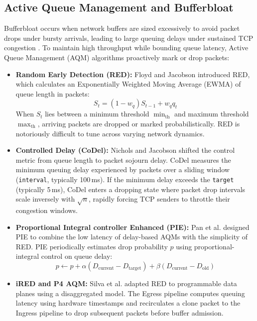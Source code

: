 \documentclass[12pt,a4paper,oneside]{report}
\begin{document}
\subsection{Active Queue Management and Bufferbloat}
Bufferbloat occurs when network buffers are sized excessively to avoid packet drops under bursty arrivals, leading to large queuing delays under sustained TCP congestion \cite{getty2011bufferbloat}. To maintain high throughput while bounding queue latency, Active Queue Management (AQM) algorithms proactively mark or drop packets:
\begin{itemize}
  \item \textbf{Random Early Detection (RED):} Floyd and Jacobson \cite{floyd1993red} introduced RED, which calculates an Exponentially Weighted Moving Average (EWMA) of queue length in packets:
  \begin{equation}
    S_t = (1 - w_q) S_{t-1} + w_q q_t
  \end{equation}
  When $S_t$ lies between a minimum threshold $\min_{\text{th}}$ and maximum threshold $\max_{\text{th}}$, arriving packets are dropped or marked probabilistically. RED is notoriously difficult to tune across varying network dynamics.
  \item \textbf{Controlled Delay (CoDel):} Nichols and Jacobson \cite{nichols2012codel} shifted the control metric from queue length to packet sojourn delay. CoDel measures the minimum queuing delay experienced by packets over a sliding window (\texttt{interval}, typically 100\,ms). If the minimum delay exceeds the \texttt{target} (typically 5\,ms), CoDel enters a dropping state where packet drop intervals scale inversely with $\sqrt{n}$, rapidly forcing TCP senders to throttle their congestion windows.
  \item \textbf{Proportional Integral controller Enhanced (PIE):} Pan et al. \cite{pan2013pie} designed PIE to combine the low latency of delay-based AQMs with the simplicity of RED. PIE periodically estimates drop probability $p$ using proportional-integral control on queue delay:
  \begin{equation}
    p \leftarrow p + \alpha (D_{\text{current}} - D_{\text{target}}) + \beta (D_{\text{current}} - D_{\text{old}})
  \end{equation}
  \item \textbf{iRED and P4 AQM:} Silva et al. \cite{silva2021ired} adapted RED to programmable data planes using a disaggregated model. The Egress pipeline computes queuing latency using hardware timestamps and recirculates a clone packet to the Ingress pipeline to drop subsequent packets before buffer admission.
\end{itemize}
\end{document}
